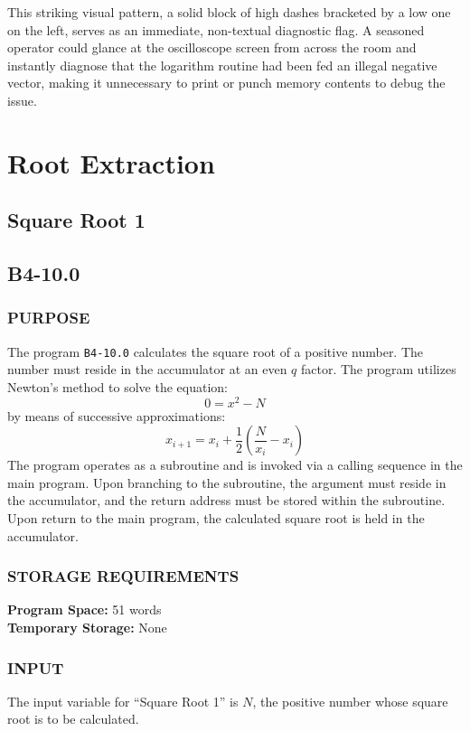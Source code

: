 \documentclass{article}
\begin{document}
This striking visual pattern, a solid block of high dashes bracketed by a low one on the left, serves as an immediate, non-textual diagnostic flag. A seasoned operator could glance at the oscilloscope screen from across the room and instantly diagnose that the logarithm routine had been fed an illegal negative vector, making it unnecessary to print or punch memory contents to debug the issue.
\newpage

\section{Root Extraction}
\subsection{Square Root 1}
\label{sec:square_root_1}

\subsection*{B4-10.0}

\subsubsection*{PURPOSE}
The program \texttt{B4-10.0} calculates the square root of a positive number. The number must reside in the accumulator at an even $q$ factor. The program utilizes Newton's method to solve the equation:
\begin{equation}
    0 = x^2 - N
\end{equation}
by means of successive approximations:
\begin{equation}
    x_{i+1} = x_i + \frac{1}{2} \left( \frac{N}{x_i} - x_i \right)
\end{equation}
The program operates as a subroutine and is invoked via a calling sequence in the main program. Upon branching to the subroutine, the argument must reside in the accumulator, and the return address must be stored within the subroutine. Upon return to the main program, the calculated square root is held in the accumulator.

\subsubsection*{STORAGE REQUIREMENTS}
\noindent
\textbf{Program Space:} 51 words \\
\textbf{Temporary Storage:} None

\subsubsection*{INPUT}
\noindent
The input variable for ``Square Root 1'' is $N$, the positive number whose square root is to be calculated.
\end{document}
